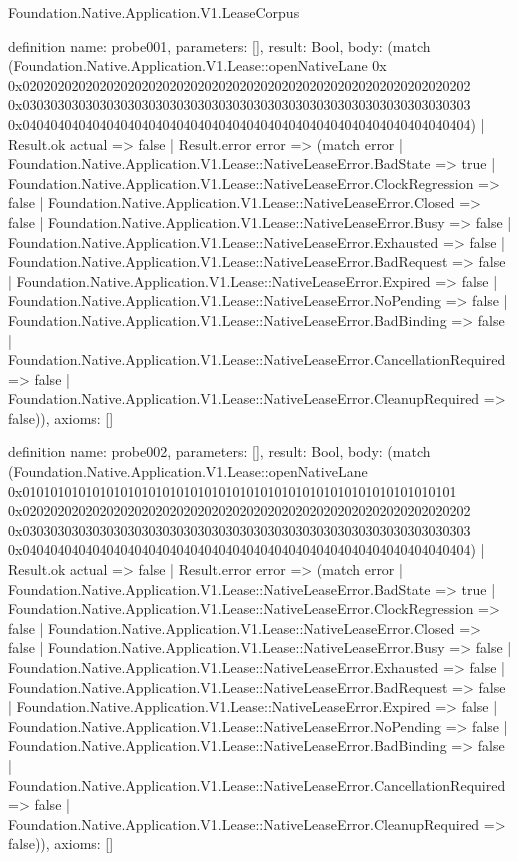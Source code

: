 \begin{lexlean}{Foundation.Native.Application.V1.LeaseCorpus}
\begin{semanticmodule}
definition{
  name: probe001,
  parameters: [],
  result: Bool,
  body: (match (Foundation.Native.Application.V1.Lease::openNativeLane 0x 0x0202020202020202020202020202020202020202020202020202020202020202 0x0303030303030303030303030303030303030303030303030303030303030303 0x0404040404040404040404040404040404040404040404040404040404040404)
    | Result.ok actual => false
    | Result.error error => (match error
      | Foundation.Native.Application.V1.Lease::NativeLeaseError.BadState => true
      | Foundation.Native.Application.V1.Lease::NativeLeaseError.ClockRegression => false
      | Foundation.Native.Application.V1.Lease::NativeLeaseError.Closed => false
      | Foundation.Native.Application.V1.Lease::NativeLeaseError.Busy => false
      | Foundation.Native.Application.V1.Lease::NativeLeaseError.Exhausted => false
      | Foundation.Native.Application.V1.Lease::NativeLeaseError.BadRequest => false
      | Foundation.Native.Application.V1.Lease::NativeLeaseError.Expired => false
      | Foundation.Native.Application.V1.Lease::NativeLeaseError.NoPending => false
      | Foundation.Native.Application.V1.Lease::NativeLeaseError.BadBinding => false
      | Foundation.Native.Application.V1.Lease::NativeLeaseError.CancellationRequired => false
      | Foundation.Native.Application.V1.Lease::NativeLeaseError.CleanupRequired => false)),
  axioms: []
}

definition{
  name: probe002,
  parameters: [],
  result: Bool,
  body: (match (Foundation.Native.Application.V1.Lease::openNativeLane 0x01010101010101010101010101010101010101010101010101010101010101 0x0202020202020202020202020202020202020202020202020202020202020202 0x0303030303030303030303030303030303030303030303030303030303030303 0x0404040404040404040404040404040404040404040404040404040404040404)
    | Result.ok actual => false
    | Result.error error => (match error
      | Foundation.Native.Application.V1.Lease::NativeLeaseError.BadState => true
      | Foundation.Native.Application.V1.Lease::NativeLeaseError.ClockRegression => false
      | Foundation.Native.Application.V1.Lease::NativeLeaseError.Closed => false
      | Foundation.Native.Application.V1.Lease::NativeLeaseError.Busy => false
      | Foundation.Native.Application.V1.Lease::NativeLeaseError.Exhausted => false
      | Foundation.Native.Application.V1.Lease::NativeLeaseError.BadRequest => false
      | Foundation.Native.Application.V1.Lease::NativeLeaseError.Expired => false
      | Foundation.Native.Application.V1.Lease::NativeLeaseError.NoPending => false
      | Foundation.Native.Application.V1.Lease::NativeLeaseError.BadBinding => false
      | Foundation.Native.Application.V1.Lease::NativeLeaseError.CancellationRequired => false
      | Foundation.Native.Application.V1.Lease::NativeLeaseError.CleanupRequired => false)),
  axioms: []
}


\end{semanticmodule}
\end{lexlean}
